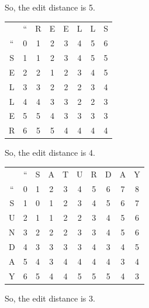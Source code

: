 \documentclass[a4paper, 12pt]{article}
\begin{document}
So, the edit distance is 5.

\bigskip

\begin{tabular}{cccccccc}
 & `` & R & E & E & L & L & S\\
 `` & 0 & 1 & 2 & 3 & 4 & 5 & 6\\
S & 1 & 1 & 2 & 3 & 4 & 5 & 5\\
E & 2 & 2 & 1 & 2 & 3 & 4 & 5\\
L & 3 & 3 & 2 & 2 & 2 & 3 & 4\\
L & 4 & 4 & 3 & 3 & 2 & 2 & 3\\
E & 5 & 5 & 4 & 3 & 3 & 3 & 3\\
R & 6 & 5 & 5 & 4 & 4 & 4 & 4
\end{tabular}

So, the edit distance is 4.

\bigskip

\begin{tabular}{cccccccccc}
 & `` & S & A & T & U & R & D & A & Y\\
 `` & 0 & 1 & 2 & 3 & 4 & 5 & 6 & 7 & 8\\
S & 1 & 0 & 1 & 2 & 3 & 4 & 5 & 6 & 7\\
U & 2 & 1 & 1 & 2 & 2 & 3 & 4 & 5 & 6\\
N & 3 & 2 & 2 & 2 & 3 & 3 & 4 & 5 & 6\\
D & 4 & 3 & 3 & 3 & 3 & 4 & 3 & 4 & 5\\
A & 5 & 4 & 3 & 4 & 4 & 4 & 4 & 3 & 4\\
Y & 6 & 5 & 4 & 4 &5 & 5 & 5 & 4 & 3
\end{tabular}

So, the edit distance is 3.
\end{document}
